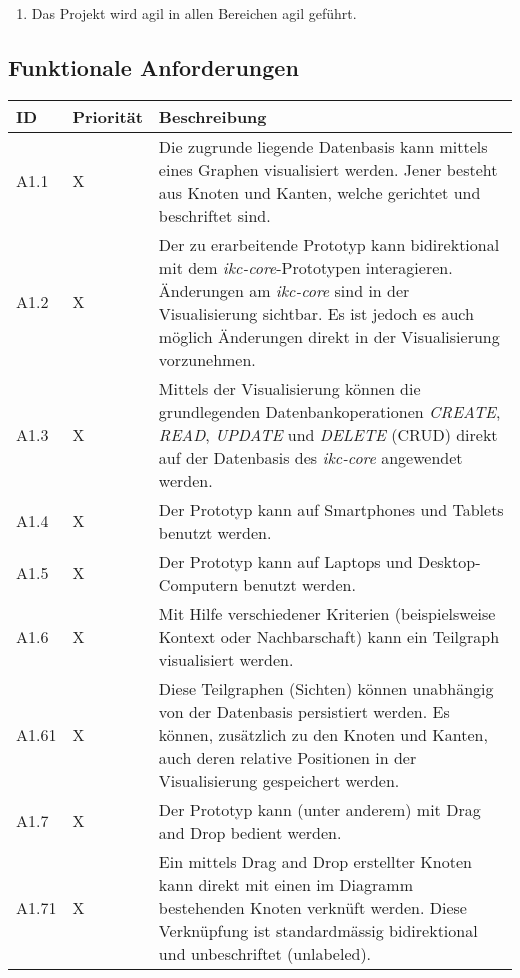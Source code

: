 \begin{enumerate}
    \item Das Projekt wird agil in allen Bereichen agil geführt.
\end{enumerate}

\subsection{Funktionale Anforderungen}

\begin{table}
  \centering
  \begin{tabular}{|p{1.1cm} | p{1.6cm} | p{8cm}|}
  \hline
    ID & Priorität & Beschreibung \\\hline
    A1.1 & X & Die zugrunde liegende Datenbasis kann mittels eines Graphen visualisiert werden. Jener besteht aus Knoten und Kanten, welche gerichtet und beschriftet sind.\\\hline
    A1.2 & X & Der zu erarbeitende Prototyp kann bidirektional mit dem \textit{ikc-core}-Prototypen interagieren. Änderungen am \textit{ikc-core} sind in der Visualisierung sichtbar. Es ist jedoch es auch möglich Änderungen direkt in der Visualisierung vorzunehmen.\\\hline
    A1.3 & X & Mittels der Visualisierung können die grundlegenden Datenbankoperationen \textit{CREATE}, \textit{READ}, \textit{UPDATE} und \textit{DELETE} (CRUD) direkt auf der Datenbasis des \textit{ikc-core} angewendet werden.\\\hline
    A1.4 & X & Der Prototyp kann auf Smartphones und Tablets benutzt werden.\\\hline
    A1.5 & X & Der Prototyp kann auf Laptops und Desktop-Computern benutzt werden.\\\hline    
    A1.6 & X & Mit Hilfe verschiedener Kriterien (beispielsweise Kontext oder Nachbarschaft) kann ein Teilgraph visualisiert werden.\\\hline 
    A1.61 & X & Diese Teilgraphen (Sichten) können unabhängig von der Datenbasis persistiert werden. Es können, zusätzlich zu den Knoten und Kanten, auch deren relative Positionen in der Visualisierung gespeichert werden.\\\hline 
    A1.7 & X & Der Prototyp kann (unter anderem) mit Drag and Drop bedient werden.\\\hline
    A1.71 & X & Ein mittels Drag and Drop erstellter Knoten kann direkt mit einen im Diagramm bestehenden Knoten verknüft werden. Diese Verknüpfung ist standardmässig bidirektional und unbeschriftet (unlabeled).\\\hline

\end{tabular}
\end{table}
